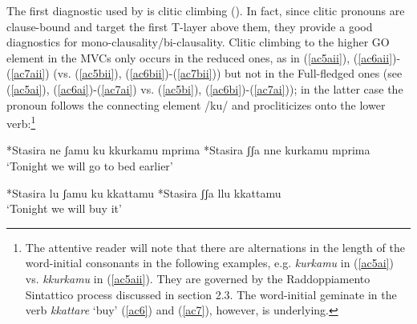 \documentclass[output=paper]{langscibook}
\begin{document}
 The first diagnostic used by \cite{cardinaletti2003a} is clitic climbing (\cite{rizzi1976a}). In fact, since clitic pronouns are clause-bound and target the first T-layer above them, they provide a good diagnostics for mono-clausality/bi-clausality. Clitic climbing to the higher GO element in the MVCs only occurs in the reduced ones, as in (\ref{ac5aii}), (\ref{ac6aii})-(\ref{ac7aii}) (vs. (\ref{ac5bii}), (\ref{ac6bii})-(\ref{ac7bii})) but not in the Full-fledged ones (see (\ref{ac5ai}), (\ref{ac6ai})-(\ref{ac7ai}) vs. (\ref{ac5bi}), (\ref{ac6bi})-(\ref{ac7ai})); in the latter case the pronoun follows the connecting element /ku/ and procliticizes onto the lower verb:\footnote{The attentive reader will note that there are alternations in the length of the word-initial consonants in the following examples, e.g. \textit{kurkamu} in (\ref{ac5ai}) vs. \textit{kkurkamu} in (\ref{ac5aii}).  They are governed by the Raddoppiamento Sintattico process discussed in section 2.3.  The word-initial geminate in the verb \textit{kkattare} ‘buy’ (\ref{ac6}) and (\ref{ac7}), however, is underlying.} 

\ea \label{ac5}
    \ea \label{ac5a}
        \z
    \ex \label{ac5b}
        \ea \label{ac5bi} *Stasira ne ʃamu ku kkurkamu mprima
        \ex \label{ac5bii} *Stasira ʃʃa nne kurkamu mprima\\
          `Tonight we will go to bed earlier'
          \z
    \z
\z

\ea \label{ac6}
    \ea \label{ac6a}
        \z
    \ex \label{ac6b}
        \ea \label{ac6bi} *Stasira lu ʃamu ku kkattamu
        \ex \label{ac6bii} *Stasira ʃʃa  llu kkattamu\\
             `Tonight we will  buy it'
        \z
    \z
\z
\end{document}
